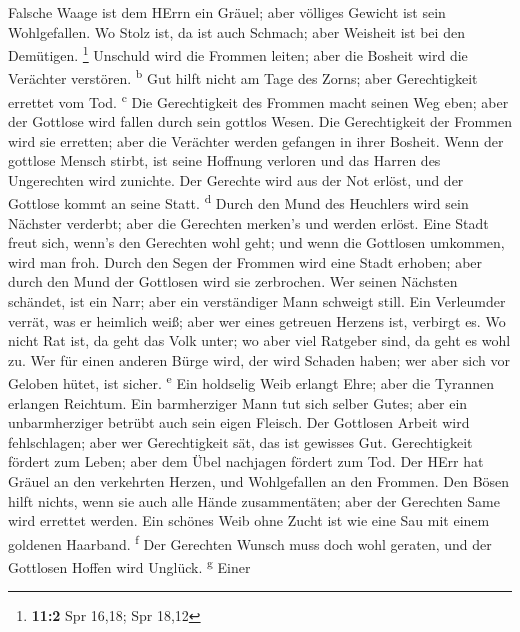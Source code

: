  Falsche Waage ist dem HErrn ein Gräuel; aber völliges
Gewicht ist sein Wohlgefallen.  Wo Stolz ist, da ist auch
Schmach; aber Weisheit ist bei den Demütigen. \footnote{\textbf{11:2}
  Spr 16,18; Spr 18,12}  Unschuld wird die Frommen leiten;
aber die Bosheit wird die Verächter verstören. \textsuperscript{b}
 Gut hilft nicht am Tage des Zorns; aber Gerechtigkeit
errettet vom Tod. \textsuperscript{c}  Die Gerechtigkeit
des Frommen macht seinen Weg eben; aber der Gottlose wird fallen durch
sein gottlos Wesen.  Die Gerechtigkeit der Frommen wird
sie erretten; aber die Verächter werden gefangen in ihrer Bosheit.
 Wenn der gottlose Mensch stirbt, ist seine Hoffnung
verloren und das Harren des Ungerechten wird zunichte. 
Der Gerechte wird aus der Not erlöst, und der Gottlose kommt an seine
Statt. \textsuperscript{d}  Durch den Mund des Heuchlers
wird sein Nächster verderbt; aber die Gerechten merken's und werden
erlöst.  Eine Stadt freut sich, wenn's den Gerechten wohl
geht; und wenn die Gottlosen umkommen, wird man froh. 
Durch den Segen der Frommen wird eine Stadt erhoben; aber durch den Mund
der Gottlosen wird sie zerbrochen.  Wer seinen Nächsten
schändet, ist ein Narr; aber ein verständiger Mann schweigt still.
 Ein Verleumder verrät, was er heimlich weiß; aber wer
eines getreuen Herzens ist, verbirgt es.  Wo nicht Rat
ist, da geht das Volk unter; wo aber viel Ratgeber sind, da geht es wohl
zu.  Wer für einen anderen Bürge wird, der wird Schaden
haben; wer aber sich vor Geloben hütet, ist sicher. \textsuperscript{e}
 Ein holdselig Weib erlangt Ehre; aber die Tyrannen
erlangen Reichtum.  Ein barmherziger Mann tut sich selber
Gutes; aber ein unbarmherziger betrübt auch sein eigen Fleisch.
 Der Gottlosen Arbeit wird fehlschlagen; aber wer
Gerechtigkeit sät, das ist gewisses Gut.  Gerechtigkeit
fördert zum Leben; aber dem Übel nachjagen fördert zum Tod.
 Der HErr hat Gräuel an den verkehrten Herzen, und
Wohlgefallen an den Frommen.  Den Bösen hilft nichts,
wenn sie auch alle Hände zusammentäten; aber der Gerechten Same wird
errettet werden.  Ein schönes Weib ohne Zucht ist wie
eine Sau mit einem goldenen Haarband. \textsuperscript{f}
 Der Gerechten Wunsch muss doch wohl geraten, und der
Gottlosen Hoffen wird Unglück. \textsuperscript{g}  Einer
